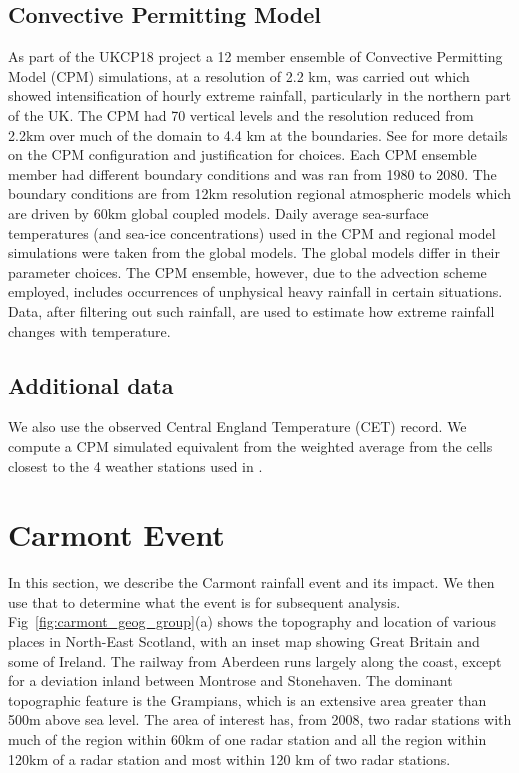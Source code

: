 \documentclass[11pt,a4paper]{article}
\begin{document}
\subsection{Convective Permitting Model}
 As part of the UKCP18 project a 12 member ensemble of Convective Permitting Model (CPM) simulations, at a resolution of 2.2 km, was carried out\parencite{kendon2023uk_cpm} which showed intensification of hourly extreme rainfall, particularly in the northern part of the UK. The CPM had 70 vertical levels and the resolution reduced from 2.2km over much of the domain to 4.4 km at the boundaries. See \cite{art:fosser20} for more details on the CPM configuration and justification for choices. Each CPM ensemble member had different boundary conditions and was ran from 1980 to 2080.  The boundary conditions  are from 12km resolution regional atmospheric models which are driven by  60km global coupled models. Daily average sea-surface temperatures (and sea-ice concentrations) used in the CPM and regional model simulations were taken from the global models. The global models differ in their parameter choices. The CPM ensemble, however, due to the advection scheme employed, includes occurrences of unphysical heavy rainfall in certain situations.  Data, after filtering out such rainfall, are used to estimate how extreme rainfall changes with temperature. 

\subsection{Additional data}
We also use the observed Central England Temperature (CET) record\parencite{parker92cet}. We compute a CPM simulated equivalent from the weighted average from the cells closest to the 4 weather stations used in \cite{parker92cet}.  

\section{Carmont Event}

In this section, we describe the Carmont rainfall event and its impact. We then use that to determine what the event is for subsequent analysis. Fig~\ref{fig:carmont_geog_group}(a) shows the topography and location of various places in North-East Scotland, with an inset map showing Great Britain and some of Ireland. The railway from Aberdeen runs largely along the coast, except for a deviation inland between Montrose and Stonehaven.  The dominant topographic feature is the Grampians,  which is an extensive area greater than 500m above sea level. The area of interest has, from 2008, two radar stations with much of the region within 60km of one radar station and  all the region within 120km of a radar station and most within 120 km of two radar stations. 
\end{document}
